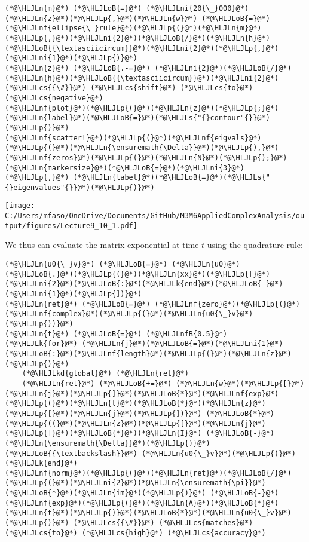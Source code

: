 \documentclass[12pt,a4paper]{article}
\newcommand{\HLJLk}[1]{\textcolor[RGB]{148,91,176}{\textbf{#1}}}
\newcommand{\HLJLkd}[1]{\textcolor[RGB]{214,102,97}{\textit{#1}}}
\newcommand{\HLJLn}[1]{#1}
\newcommand{\HLJLnf}[1]{\textcolor[RGB]{66,102,213}{#1}}
\newcommand{\HLJLs}[1]{\textcolor[RGB]{201,61,57}{#1}}
\newcommand{\HLJLnfB}[1]{\textcolor[RGB]{59,151,46}{#1}}
\newcommand{\HLJLni}[1]{\textcolor[RGB]{59,151,46}{#1}}
\newcommand{\HLJLoB}[1]{\textcolor[RGB]{102,102,102}{\textbf{#1}}}
\newcommand{\HLJLp}[1]{#1}
\newcommand{\HLJLcs}[1]{\textcolor[RGB]{153,153,119}{\textit{#1}}}
\begin{document}
\begin{lstlisting}
(*@\HLJLn{m}@*) (*@\HLJLoB{=}@*) (*@\HLJLni{20{\_}000}@*)
(*@\HLJLn{z}@*)(*@\HLJLp{,}@*)(*@\HLJLn{w}@*) (*@\HLJLoB{=}@*) (*@\HLJLnf{ellipse{\_}rule}@*)(*@\HLJLp{(}@*)(*@\HLJLn{m}@*)(*@\HLJLp{,}@*)(*@\HLJLni{2}@*)(*@\HLJLoB{/}@*)(*@\HLJLn{h}@*)(*@\HLJLoB{{\textasciicircum}}@*)(*@\HLJLni{2}@*)(*@\HLJLp{,}@*)(*@\HLJLni{1}@*)(*@\HLJLp{)}@*)
(*@\HLJLn{z}@*) (*@\HLJLoB{.-=}@*) (*@\HLJLni{2}@*)(*@\HLJLoB{/}@*)(*@\HLJLn{h}@*)(*@\HLJLoB{{\textasciicircum}}@*)(*@\HLJLni{2}@*) (*@\HLJLcs{{\#}}@*) (*@\HLJLcs{shift}@*) (*@\HLJLcs{to}@*) (*@\HLJLcs{negative}@*)
(*@\HLJLnf{plot}@*)(*@\HLJLp{(}@*)(*@\HLJLn{z}@*)(*@\HLJLp{;}@*) (*@\HLJLn{label}@*)(*@\HLJLoB{=}@*)(*@\HLJLs{"{}contour"{}}@*)(*@\HLJLp{)}@*)
(*@\HLJLnf{scatter!}@*)(*@\HLJLp{(}@*)(*@\HLJLnf{eigvals}@*)(*@\HLJLp{(}@*)(*@\HLJLn{\ensuremath{\Delta}}@*)(*@\HLJLp{),}@*) (*@\HLJLnf{zeros}@*)(*@\HLJLp{(}@*)(*@\HLJLn{N}@*)(*@\HLJLp{);}@*) (*@\HLJLn{markersize}@*)(*@\HLJLoB{=}@*)(*@\HLJLni{3}@*)(*@\HLJLp{,}@*) (*@\HLJLn{label}@*)(*@\HLJLoB{=}@*)(*@\HLJLs{"{}eigenvalues"{}}@*)(*@\HLJLp{)}@*)
\end{lstlisting}

\texttt{[image: C:/Users/mfaso/OneDrive/Documents/GitHub/M3M6AppliedComplexAnalysis/output/figures/Lecture9\_10\_1.pdf]}

We thus can evaluate the matrix exponential at time $t$ using the quadrature rule:


\begin{lstlisting}
(*@\HLJLn{u0{\_}v}@*) (*@\HLJLoB{=}@*) (*@\HLJLn{u0}@*)(*@\HLJLoB{.}@*)(*@\HLJLp{(}@*)(*@\HLJLn{xx}@*)(*@\HLJLp{[}@*)(*@\HLJLni{2}@*)(*@\HLJLoB{:}@*)(*@\HLJLk{end}@*)(*@\HLJLoB{-}@*)(*@\HLJLni{1}@*)(*@\HLJLp{])}@*)
(*@\HLJLn{ret}@*) (*@\HLJLoB{=}@*) (*@\HLJLnf{zero}@*)(*@\HLJLp{(}@*)(*@\HLJLnf{complex}@*)(*@\HLJLp{(}@*)(*@\HLJLn{u0{\_}v}@*)(*@\HLJLp{))}@*)
(*@\HLJLn{t}@*) (*@\HLJLoB{=}@*) (*@\HLJLnfB{0.5}@*)
(*@\HLJLk{for}@*) (*@\HLJLn{j}@*)(*@\HLJLoB{=}@*)(*@\HLJLni{1}@*)(*@\HLJLoB{:}@*)(*@\HLJLnf{length}@*)(*@\HLJLp{(}@*)(*@\HLJLn{z}@*)(*@\HLJLp{)}@*)
    (*@\HLJLkd{global}@*) (*@\HLJLn{ret}@*)
    (*@\HLJLn{ret}@*) (*@\HLJLoB{+=}@*) (*@\HLJLn{w}@*)(*@\HLJLp{[}@*)(*@\HLJLn{j}@*)(*@\HLJLp{]}@*)(*@\HLJLoB{*}@*)(*@\HLJLnf{exp}@*)(*@\HLJLp{(}@*)(*@\HLJLn{t}@*)(*@\HLJLoB{*}@*)(*@\HLJLn{z}@*)(*@\HLJLp{[}@*)(*@\HLJLn{j}@*)(*@\HLJLp{])}@*) (*@\HLJLoB{*}@*) (*@\HLJLp{((}@*)(*@\HLJLn{z}@*)(*@\HLJLp{[}@*)(*@\HLJLn{j}@*)(*@\HLJLp{]}@*)(*@\HLJLoB{*}@*)(*@\HLJLn{I}@*) (*@\HLJLoB{-}@*) (*@\HLJLn{\ensuremath{\Delta}}@*)(*@\HLJLp{)}@*) (*@\HLJLoB{{\textbackslash}}@*) (*@\HLJLn{u0{\_}v}@*)(*@\HLJLp{)}@*)
(*@\HLJLk{end}@*)
(*@\HLJLnf{norm}@*)(*@\HLJLp{(}@*)(*@\HLJLn{ret}@*)(*@\HLJLoB{/}@*)(*@\HLJLp{(}@*)(*@\HLJLni{2}@*)(*@\HLJLn{\ensuremath{\pi}}@*)(*@\HLJLoB{*}@*)(*@\HLJLn{im}@*)(*@\HLJLp{)}@*) (*@\HLJLoB{-}@*) (*@\HLJLnf{exp}@*)(*@\HLJLp{(}@*)(*@\HLJLn{A}@*)(*@\HLJLoB{*}@*)(*@\HLJLn{t}@*)(*@\HLJLp{)}@*)(*@\HLJLoB{*}@*)(*@\HLJLn{u0{\_}v}@*)(*@\HLJLp{)}@*) (*@\HLJLcs{{\#}}@*) (*@\HLJLcs{matches}@*) (*@\HLJLcs{to}@*) (*@\HLJLcs{high}@*) (*@\HLJLcs{accuracy}@*)
\end{lstlisting}
\end{document}
